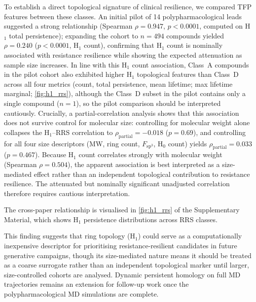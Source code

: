 \documentclass[11pt,a4paper]{article}
\begin{document}
To establish a direct topological signature of clinical resilience, we compared TFP features between these classes. An initial pilot of 14 polypharmacological leads suggested a strong relationship (Spearman $\rho = \num{0.947}$, $p < \num{0.0001}$, computed on H$_1$ total persistence); expanding the cohort to $n = \num{494}$ compounds yielded $\rho = \num{0.240}$ ($p < \num{0.0001}$, H$_1$ count), confirming that H$_1$ count is nominally associated with resistance resilience while showing the expected attenuation as sample size increases. In line with this H$_1$ count association, Class~A compounds in the pilot cohort also exhibited higher H$_1$ topological features than Class~D across all four metrics (count, total persistence, mean lifetime; max lifetime marginal; \cref{fig:h1_rrs}), although the Class~D subset in the pilot contains only a single compound ($n = 1$), so the pilot comparison should be interpreted cautiously. Crucially, a partial-correlation analysis shows that this association does not survive control for molecular size: controlling for molecular weight alone collapses the H$_1$--RRS correlation to $\rho_{\text{partial}} = -\num{0.018}$ ($p = \num{0.69}$), and controlling for all four size descriptors (MW, ring count, $F_{\mathrm{sp}^3}$, H$_0$ count) yields $\rho_{\text{partial}} = \num{0.033}$ ($p = \num{0.467}$). Because H$_1$ count correlates strongly with molecular weight (Spearman $\rho = \num{0.504}$), the apparent association is best interpreted as a size-mediated effect rather than an independent topological contribution to resistance resilience. The attenuated but nominally significant unadjusted correlation therefore requires cautious interpretation.

The cross-paper relationship is visualised in \cref{fig:h1_rrs} of the Supplementary Material, which shows H$_1$ persistence distributions across RRS classes.

This finding suggests that ring topology (H$_1$) could serve as a computationally inexpensive descriptor for prioritising resistance-resilient candidates in future generative campaigns, though its size-mediated nature means it should be treated as a coarse surrogate rather than an independent topological marker until larger, size-controlled cohorts are analysed. Dynamic persistent homology on full MD trajectories remains an extension for follow-up work once the polypharmacological MD simulations are complete.

\end{document}
